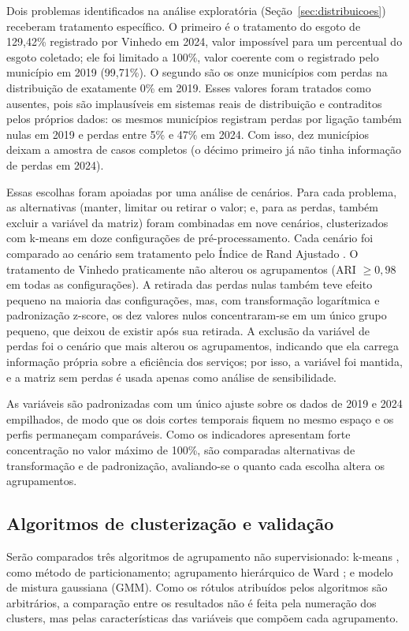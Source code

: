 \documentclass[12pt]{article}
\begin{document}
Dois problemas identificados na análise exploratória (Seção~\ref{sec:distribuicoes}) receberam
tratamento específico. O primeiro é o tratamento do esgoto de 129,42\% registrado por Vinhedo em
2024, valor impossível para um percentual do esgoto coletado; ele foi limitado a 100\%, valor
coerente com o registrado pelo município em 2019 (99,71\%). O segundo são os onze municípios com
perdas na distribuição de exatamente 0\% em 2019. Esses valores foram tratados como ausentes, pois
são implausíveis em sistemas reais de distribuição e contraditos pelos próprios dados: os mesmos
municípios registram perdas por ligação também nulas em 2019 e perdas entre 5\% e 47\% em 2024.
Com isso, dez municípios deixam a amostra de casos completos (o décimo primeiro já não tinha
informação de perdas em 2024).

Essas escolhas foram apoiadas por uma análise de cenários. Para cada problema, as alternativas
(manter, limitar ou retirar o valor; e, para as perdas, também excluir a variável da matriz) foram
combinadas em nove cenários, clusterizados com k-means em doze configurações de pré-processamento.
Cada cenário foi comparado ao cenário sem tratamento pelo Índice de Rand Ajustado \cite{hubert1985}.
O tratamento de Vinhedo praticamente não alterou os agrupamentos (ARI $\geq 0{,}98$ em todas as
configurações). A retirada das perdas nulas também teve efeito pequeno na maioria das
configurações, mas, com transformação logarítmica e padronização z-score, os dez valores nulos
concentraram-se em um único grupo pequeno, que deixou de existir após sua retirada. A exclusão da
variável de perdas foi o cenário que mais alterou os agrupamentos, indicando que ela carrega
informação própria sobre a eficiência dos serviços; por isso, a variável foi mantida, e a matriz sem
perdas é usada apenas como análise de sensibilidade.

As variáveis são
padronizadas com um único ajuste sobre os dados de 2019 e 2024 empilhados, de modo que os dois
cortes temporais fiquem no mesmo espaço e os perfis permaneçam comparáveis. Como os indicadores
apresentam forte concentração no valor máximo de 100\%, são comparadas alternativas de transformação
e de padronização, avaliando-se o quanto cada escolha altera os agrupamentos.

\subsection{Algoritmos de clusterização e validação}

Serão comparados três algoritmos de agrupamento não supervisionado: k-means \cite{macqueen1967},
como método de particionamento; agrupamento hierárquico de Ward \cite{ward1963}; e modelo de
mistura gaussiana (GMM). Como os rótulos atribuídos pelos algoritmos são arbitrários, a comparação
entre os resultados não é feita pela numeração dos clusters, mas pelas características das variáveis
que compõem cada agrupamento.
\end{document}
